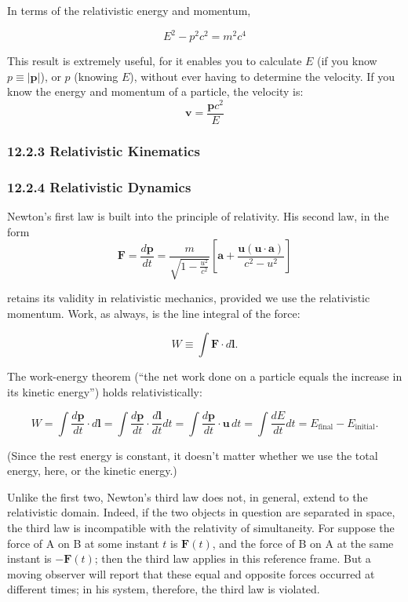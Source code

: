 \documentclass[12pt]{book}
\begin{document}
        In terms of the relativistic energy and momentum,
        
        \[
        E^2 - p^2c^2 = m^2c^4 
        \]
        
        \newline This result is extremely useful, for it enables you to calculate \(E\) (if you know \( p \equiv |\bm{p}| \)), or \( p \) (knowing \( E \)), without ever having to determine the velocity. If you know the energy and momentum of a particle, the velocity is: 
        \[
        \bm{v}=\frac{\bm{p}c^2}{E}
        \]
        
    \subsubsection{12.2.3 Relativistic Kinematics}
    \subsubsection{12.2.4 Relativistic Dynamics}

        Newton’s first law is built into the principle of relativity. His second law, in the form
        \[
        \bm{F} = \frac{d\bm{p}}{dt} =\frac{m}{\sqrt{1 - \frac{u^2}{c^2}}} \left[ \mathbf{a} + \frac{\mathbf{u}(\mathbf{u} \cdot \mathbf{a})}{c^2 - u^2} \right]
        \]
        
        retains its validity in relativistic mechanics, provided we use the relativistic momentum.
        Work, as always, is the line integral of the force:
        
        \[
        W \equiv \int \bm{F} \cdot d\bm{l}.
        \]
        
        The work-energy theorem (“the net work done on a particle equals the increase in its kinetic energy”) holds relativistically:
        
        \[
        W = \int \frac{d\bm{p}}{dt} \cdot d\bm{l} = \int \frac{d\bm{p}}{dt} \cdot \frac{d\bm{l}}{dt} dt = \int \frac{d\bm{p}}{dt} \cdot \bm{u} \, dt= \int \frac{dE}{dt} dt = E_{\text{final}} - E_{\text{initial}}.
        \]
        
        (Since the rest energy is constant, it doesn’t matter whether we use the total energy, here, or the kinetic energy.)
        
        Unlike the first two, Newton’s third law does not, in general, extend to the relativistic domain. Indeed, if the two objects in question are separated in space, the third law is incompatible with the relativity of simultaneity. For suppose the force of A on B at some instant \(t\) is \(\bm{F}(t)\), and the force of B on A at the same instant is \(-\bm{F}(t)\); then the third law applies in this reference frame. But a moving observer will report that these equal and opposite forces occurred at different times; in his system, therefore, the third law is violated.
        
\end{document}
